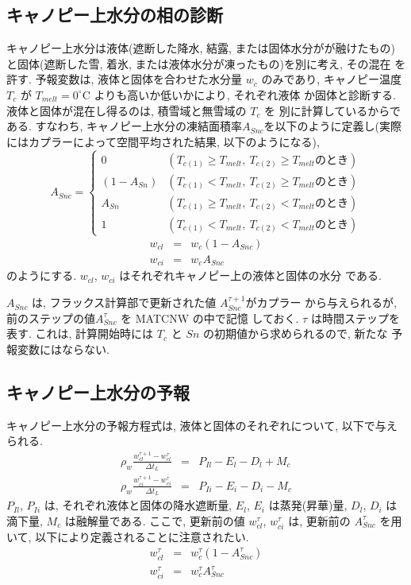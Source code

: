 \subsection{キャノピー上水分の相の診断}

キャノピー上水分は液体(遮断した降水, 結露, または固体水分がが融けたもの)
と固体(遮断した雪, 着氷, または液体水分が凍ったもの)を別に考え, その混在
を許す. 
予報変数は, 液体と固体を合わせた水分量 $w_c$ のみであり, キャノピー温度
$T_c$ が $T_{melt} = 0^{\circ}$C よりも高いか低いかにより, それぞれ液体
か固体と診断する. 液体と固体が混在し得るのは, 積雪域と無雪域の $T_c$ を
別に計算しているからである. 
すなわち, キャノピー上水分の凍結面積率$A_{Snc}$を以下のように定義し(実際
にはカプラーによって空間平均された結果, 以下のようになる), 
\begin{equation}
 A_{Snc} = \left\{
\begin{array}{ll}
 0 & (T_{c(1)} \geq T_{melt}, \ T_{c(2)} \geq T_{melt} \mbox{のとき})\\
 (1-A_{Sn}) & (T_{c(1)} < T_{melt}, \ T_{c(2)} \geq T_{melt} \mbox{のとき})\\
 A_{Sn} & (T_{c(1)} \geq T_{melt}, \ T_{c(2)} < T_{melt} \mbox{のとき})\\
 1 & (T_{c(1)} < T_{melt}, \ T_{c(2)} < T_{melt} \mbox{のとき})
\end{array}
\right.
\end{equation}
\begin{eqnarray}
 w_{cl} &=& w_c ( 1 - A_{Snc}) \\
 w_{ci} &=& w_c A_{Snc}
\end{eqnarray}
のようにする. $w_{cl}$, $w_{ci}$ はそれぞれキャノピー上の液体と固体の水分
である. 

$A_{Snc}$ は, フラックス計算部で更新された値 $A_{Snc}^{\tau+1}$がカプラー
から与えられるが, 前のステップの値$A_{Snc}^{\tau}$ を MATCNW の中で記憶
しておく. $\tau$ は時間ステップを表す. 
これは, 計算開始時には $T_c$ と $Sn$ の初期値から求められるので, 新たな
予報変数にはならない. 

\subsection{キャノピー上水分の予報}

キャノピー上水分の予報方程式は, 液体と固体のそれぞれについて, 以下で与え
られる. 
\begin{eqnarray}
 \rho_w \frac{w_{cl}^{\tau+1} - w_{cl}^{\tau}}{\Delta t_L} 
  &=& P_{Il} - E_l - D_l + M_c \\
 \rho_w \frac{w_{ci}^{\tau+1} - w_{ci}^{\tau}}{\Delta t_L}
  &=& P_{Ii} - E_i - D_i - M_c
\end{eqnarray}
$P_{Il}$, $P_{Ii}$ は, それぞれ液体と固体の降水遮断量, 
$E_l$, $E_i$ は蒸発(昇華)量, 
$D_l$, $D_i$ は滴下量, 
$M_c$ は融解量である. 
ここで, 更新前の値 $w_{cl}^{\tau}$, $w_{ci}^{\tau}$ は, 更新前の
$A_{Snc}^{\tau}$ を用いて, 以下により定義されることに注意されたい. 
\begin{eqnarray}
 w_{cl}^{\tau} &=& w_c^{\tau} ( 1 - A_{Snc}^{\tau}) \\
 w_{ci}^{\tau} &=& w_c^{\tau} A_{Snc}^{\tau}
\end{eqnarray}

